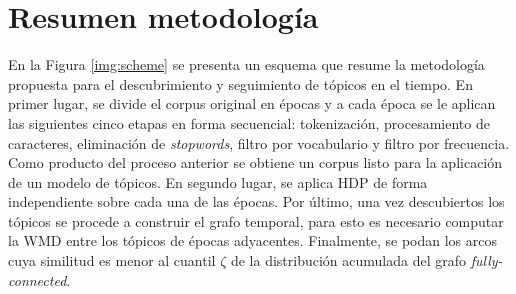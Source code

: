 \section{Resumen metodología}
\label{sec:methodology_resume}

En la Figura \ref{img:scheme} se presenta un esquema que resume la metodología propuesta para el descubrimiento y seguimiento de tópicos en el tiempo. En primer lugar, se divide el corpus original en épocas y a cada época se le aplican las siguientes cinco etapas en forma secuencial: tokenización, procesamiento de caracteres, eliminación de \textit{stopwords}, filtro por vocabulario y filtro por frecuencia. Como producto del proceso anterior se obtiene un corpus listo para la aplicación de un modelo de tópicos. En segundo lugar, se aplica HDP de forma independiente sobre cada una de las épocas. Por último, una vez descubiertos los tópicos se procede a construir el grafo temporal, para esto es necesario computar la WMD entre los tópicos de épocas adyacentes. Finalmente, se podan los arcos cuya similitud es menor al cuantil $\zeta$ de la distribución acumulada del grafo \textit{fully-connected}.

\def\db[#1,#2,#3,#4,#5]#6{%
  \node[draw, cylinder, alias=cyl, shape border rotate=90, aspect=#3, %
  minimum height=#1, minimum width=#2, outer sep=-0.5, color=black] (#4) at #5 {};%
  \node at #5 {#6};%
}
\def\boxtext[#1,#2,#3,#4,#5]#6{
        \node[draw=black, rounded corners, minimum height=#1,minimum width=#2, text width=6em] (#4) at #5 {}; 
        \node[anchor=#3,inner sep=4pt,] at (#4.#3)  {#6};
}
\def\isaedge[#1,#2,#3,#4];{ 
  \draw[-triangle 60,color=black!20!black,#4,fill=white] (#1) -- #3
  (#2);  
}

